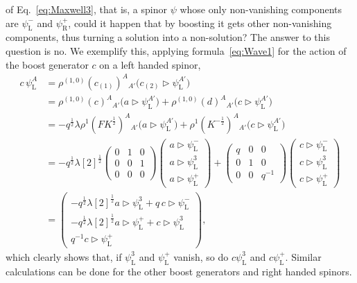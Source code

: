 \documentclass[12pt,a4paper]{article}
\newcommand{\tr}{\triangleright}
\begin{document}
of Eq.~\eqref{eq:Maxwell3}, that is, a spinor $\psi$ whose only
non-vanishing components are $\psi_\mathrm{L}^-$ and
$\psi_\mathrm{R}^+$, could it happen that by boosting it gets other
non-vanishing components, thus turning a solution into a non-solution?
The answer to this question is no. We exemplify this, applying
formula~\eqref{eq:Wave1} for the action of the boost generator $c$ on
a left handed spinor,
\begin{equation}
\begin{split}
  c\, \psi_\mathrm{L}^A
  &= \rho^{(1,0)}(c_{(1)})^A{}_{A'}
     \bigl(c_{(2)}\tr \psi_\mathrm{L}^{A'}\bigr) \\
  &= \rho^{(1,0)}(c)^A{}_{A'} \bigl(a\tr \psi_\mathrm{L}^{A'}\bigr)
    +\rho^{(1,0)}(d)^A{}_{A'} \bigl(c\tr \psi_\mathrm{L}^{A'}\bigr) \\
  &= -q^{\frac{1}{2}}\lambda \rho^{1}(FK^{\frac{1}{2}})^A{}_{A'}
      \bigl(a\tr \psi_\mathrm{L}^{A'}\bigr)
    +\rho^{1}(K^{-\frac{1}{2}})^A{}_{A'}
      \bigl(c\tr \psi_\mathrm{L}^{A'}\bigr) \\
  &= -q^{\frac{1}{2}}\lambda[2]^{\frac{1}{2}}
    \begin{pmatrix}0&1&0\\0&0&1\\0&0&0\end{pmatrix}
    \begin{pmatrix} a\tr \psi_\mathrm{L}^-\\
                    a\tr \psi_\mathrm{L}^3\\
                    a\tr \psi_\mathrm{L}^+ \end{pmatrix}
    +\begin{pmatrix}q&0&0\\0&1&0\\0&0&q^{-1}\end{pmatrix}
    \begin{pmatrix} c\tr \psi_\mathrm{L}^-\\
                    c\tr \psi_\mathrm{L}^3\\
                    c\tr \psi_\mathrm{L}^+ \end{pmatrix} \\
  &=\begin{pmatrix}
      -q^{\frac{1}{2}}\lambda[2]^{\frac{1}{2}} a\tr \psi_\mathrm{L}^3
      +q\,c\tr \psi_\mathrm{L}^- \\
      -q^{\frac{1}{2}}\lambda[2]^{\frac{1}{2}} a\tr \psi_\mathrm{L}^+
      +c\tr \psi_\mathrm{L}^3 \\
      q^{-1} c\tr \psi_\mathrm{L}^+
    \end{pmatrix},
\end{split}
\end{equation}
which clearly shows that, if $\psi_\mathrm{L}^3$ and
$\psi_\mathrm{L}^+$ vanish, so do $c\psi_\mathrm{L}^3$ and
$c\psi_\mathrm{L}^+$. Similar calculations can be done for the other
boost generators and right handed spinors.
\end{document}
